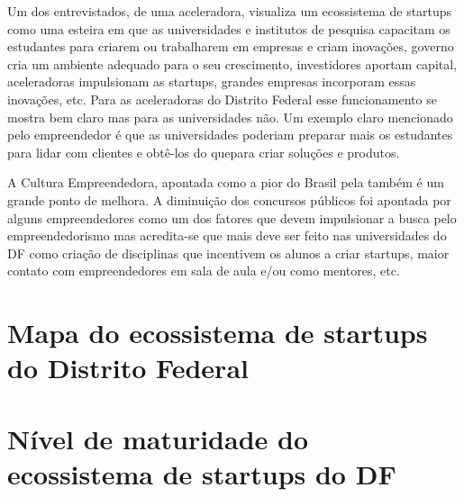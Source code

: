 Um dos entrevistados, de uma aceleradora, visualiza um ecossistema de startups como uma esteira em que as universidades e institutos de pesquisa capacitam os estudantes para criarem ou trabalharem em empresas e criam inovações, governo cria um ambiente adequado para o seu crescimento, investidores aportam capital, aceleradoras impulsionam as startups, grandes empresas incorporam essas inovações, etc. Para as aceleradoras do Distrito Federal esse funcionamento se mostra bem claro mas para as universidades não. Um exemplo claro mencionado pelo empreendedor é que as universidades poderiam preparar mais os estudantes para lidar com clientes e obtê-los do quepara criar soluções e produtos.

A Cultura Empreendedora, apontada como a pior do Brasil pela  também é um grande ponto de melhora. A diminuição dos concursos públicos foi apontada por alguns empreendedores como um dos fatores que devem impulsionar a busca pelo empreendedorismo mas acredita-se que mais deve ser feito nas universidades do DF como criação de disciplinas que incentivem os alunos a criar startups, maior contato com empreendedores em sala de aula e/ou como mentores, etc.

\section{Mapa do ecossistema de startups do Distrito Federal}
\label{mapa_do_ecossistema_do_distrito_federal}


\section{Nível de maturidade do ecossistema de startups do DF}
\label{nivel_de_maturidade}

